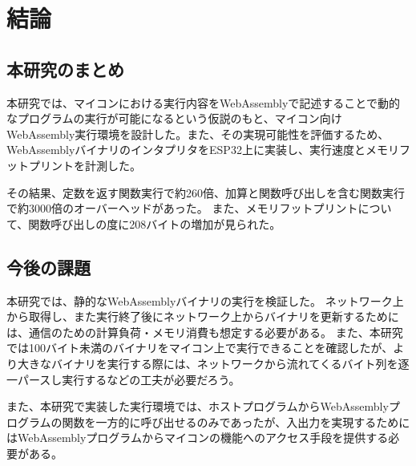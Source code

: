 \chapter{結論}
\label{chap:conclusion}

\section{本研究のまとめ}
\label{section:conclusion}

本研究では、マイコンにおける実行内容をWebAssemblyで記述することで動的なプログラムの実行が可能になるという仮説のもと、マイコン向けWebAssembly実行環境を設計した。また、その実現可能性を評価するため、WebAssemblyバイナリのインタプリタをESP32上に実装し、実行速度とメモリフットプリントを計測した。

その結果、定数を返す関数実行で約260倍、加算と関数呼び出しを含む関数実行で約3000倍のオーバーヘッドがあった。
また、メモリフットプリントについて、関数呼び出しの度に208バイトの増加が見られた。

\section{今後の課題}

本研究では、静的なWebAssemblyバイナリの実行を検証した。
ネットワーク上から取得し、また実行終了後にネットワーク上からバイナリを更新するためには、通信のための計算負荷・メモリ消費も想定する必要がある。
また、本研究では100バイト未満のバイナリをマイコン上で実行できることを確認したが、より大きなバイナリを実行する際には、ネットワークから流れてくるバイト列を逐一パースし実行するなどの工夫が必要だろう。

また、本研究で実装した実行環境では、ホストプログラムからWebAssemblyプログラムの関数を一方的に呼び出せるのみであったが、入出力を実現するためにはWebAssemblyプログラムからマイコンの機能へのアクセス手段を提供する必要がある。
